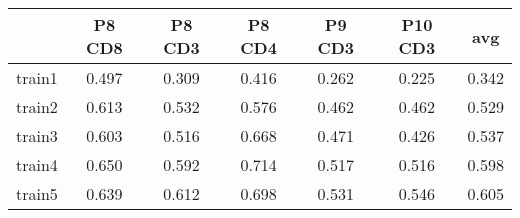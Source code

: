\documentclass{article}
\begin{document}
\begin{tabular}{lcccccc}
   \hline  &P8 CD8& P8 CD3& P8 CD4& P9 CD3& P10 CD3& avg\\ 
\hline
train1 & 0.497 & 0.309 & 0.416 & 0.262 & 0.225 & 0.342 \\ 
  train2 & 0.613 & 0.532 & 0.576 & 0.462 & 0.462 & 0.529 \\ 
  train3 & 0.603 & 0.516 & 0.668 & 0.471 & 0.426 & 0.537 \\ 
  train4 & 0.650 & 0.592 & 0.714 & 0.517 & 0.516 & 0.598 \\ 
  train5 & 0.639 & 0.612 & 0.698 & 0.531 & 0.546 & 0.605 \\ 
   \hline
\end{tabular}
\end{document}
